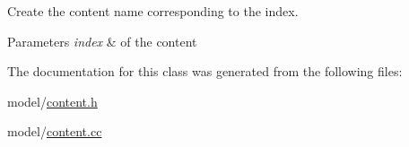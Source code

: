 Create the content name corresponding to the index. 


\begin{DoxyParams}{Parameters}
{\em index} & of the content \\
\hline
\end{DoxyParams}


The documentation for this class was generated from the following files\-:\begin{DoxyCompactItemize}
\item 
model/\hyperlink{content_8h}{content.\-h}\item 
model/\hyperlink{content_8cc}{content.\-cc}\end{DoxyCompactItemize}
